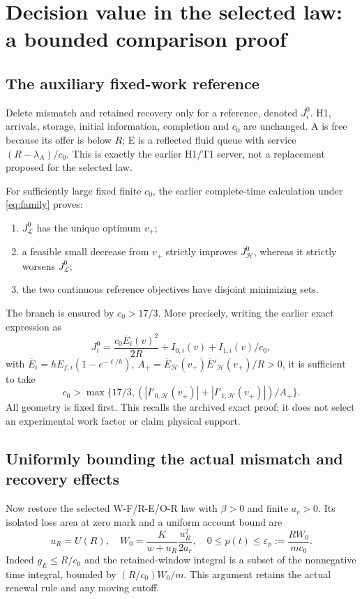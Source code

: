 \documentclass[11pt,a4paper]{article}
\begin{document}
\section{Decision value in the selected law: a bounded comparison proof}
\subsection{The auxiliary fixed-work reference}
Delete mismatch and retained recovery only for a reference, denoted $J_i^0$.
H1, arrivals, storage, initial information, completion and $c_0$ are unchanged.
A is free because its offer is below $R$; E is a reflected fluid queue with
service $(R-\lambda_A)/c_0$. This is exactly the earlier H1/T1 server, not
a replacement proposed for the selected law.

For sufficiently large fixed finite $c_0$, the earlier complete-time
calculation under \eqref{eq:family} proves:
\begin{enumerate}
\item $J^0_{\mathcal L}$ has the unique optimum $v_+$;
\item a feasible small decrease from $v_+$ strictly improves
$J^0_{\mathcal H}$, whereas it strictly worsens $J^0_{\mathcal L}$;
\item the two continuous reference objectives have disjoint minimizing sets.
\end{enumerate}
The branch is ensured by $c_0>17/3$. More precisely, writing the earlier
exact expression as
\begin{equation}
 J_i^0=\frac{c_0\overline E_i(v)^2}{2R}
       +I_{0,i}(v)+I_{1,i}(v)/c_0,
 \label{eq:oldexpand}
\end{equation}
with $\overline E_i=hE_{f,i}(1-e^{-\ell/h})$,
$A_+=\overline E_{\mathcal H}(v_+)
\overline E'_{\mathcal H}(v_+)/R>0$, it is sufficient to take
\begin{equation}
 c_0>\max\{17/3,(|I'_{0,\mathcal H}(v_+)|+
                     |I'_{1,\mathcal H}(v_+)|)/A_+\}.
 \label{eq:c0range}
\end{equation}
All geometry is fixed first. This recalls the archived exact proof; it
does not select an experimental work factor or claim physical support.

\subsection{Uniformly bounding the actual mismatch and recovery effects}
Now restore the selected W-F/R-E/O-R law with $\beta>0$ and finite $a_r>0$.
Its isolated loss area at zero mark and a uniform account bound are
\begin{equation}
 u_R=U(R),\quad W_0=\frac{K}{w+u_R}\frac{u_R^2}{2a_r},\quad
 0\leq p(t)\leq\varepsilon_p:=\frac{R W_0}{mc_0}.
 \label{eq:smallloss}
\end{equation}
Indeed $g_E\leq R/c_0$ and the retained-window integral is a subset of
the nonnegative time integral, bounded by $(R/c_0)W_0/m$. This argument
retains the actual renewal rule and any moving cutoff.
\end{document}
